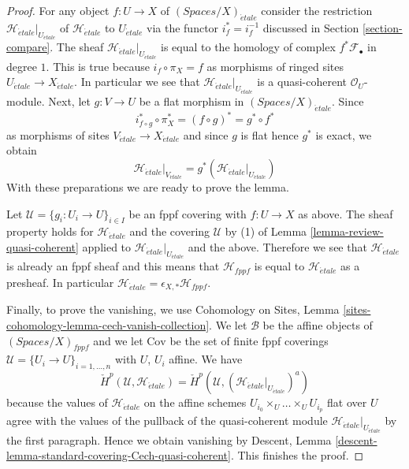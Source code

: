 \documentclass{stacks-project}
\theoremstyle{plain}
\theoremstyle{definition}
\theoremstyle{remark}
\numberwithin{equation}{subsection}
\def\etale{{\acute{e}tale}}
\begin{document}
\begin{proof}
For any object $f : U \to X$ of $(\textit{Spaces}/X)_\etale$
consider the restriction
$\mathcal{H}_\etale|_{U_\etale}$ of $\mathcal{H}_\etale$ to $U_\etale$ via
the functor $i_f^* = i_f^{-1}$ discussed in Section \ref{section-compare}.
The sheaf $\mathcal{H}_\etale|_{U_\etale}$
is equal to the homology of complex $f^*\mathcal{F}_\bullet$ in degree $1$.
This is true because $i_f \circ \pi_X = f$ as morphisms of ringed sites
$U_\etale \to X_\etale$. In particular we see that
$\mathcal{H}_\etale|_{U_\etale}$ is a quasi-coherent $\mathcal{O}_U$-module.
Next, let $g : V \to U$ be a flat
morphism in $(\textit{Spaces}/X)_\etale$. Since
$$
i_{f \circ g}^* \circ \pi_X^* = (f \circ g)^* = g^* \circ f^*
$$
as morphisms of sites $V_\etale \to X_\etale$ and since $g$ is flat
hence $g^*$ is exact, we obtain
$$
\mathcal{H}_\etale|_{V_\etale} =
g^*\left(\mathcal{H}_\etale|_{U_\etale}\right)
$$
With these preparations we are ready to prove the lemma.

\medskip\noindent
Let $\mathcal{U} = \{g_i : U_i \to U\}_{i \in I}$ be an fppf covering
with $f : U \to X$ as above. The sheaf property holds for
$\mathcal{H}_\etale$ and the covering $\mathcal{U}$
by (1) of Lemma \ref{lemma-review-quasi-coherent}
applied to $\mathcal{H}_\etale|_{U_\etale}$ and the above.
Therefore we see that $\mathcal{H}_\etale$ is already an fppf
sheaf and this means that $\mathcal{H}_{fppf}$ is
equal to $\mathcal{H}_\etale$
as a presheaf. In particular
$\mathcal{H}_\etale = \epsilon_{X, *}\mathcal{H}_{fppf}$.

\medskip\noindent
Finally, to prove the vanishing, we use
Cohomology on Sites, Lemma \ref{sites-cohomology-lemma-cech-vanish-collection}.
We let $\mathcal{B}$ be the affine objects of
$(\textit{Spaces}/X)_{fppf}$ and we let
$\text{Cov}$ be the set of finite fppf coverings
$\mathcal{U} = \{U_i \to U\}_{i = 1, \ldots, n}$ with $U$, $U_i$ affine.
We have
$$
{\check H}^p(\mathcal{U}, \mathcal{H}_\etale) =
{\check H}^p(\mathcal{U}, \left(\mathcal{H}_\etale|_{U_\etale}\right)^a)
$$
because the values of $\mathcal{H}_\etale$ on the
affine schemes $U_{i_0} \times_U \ldots \times_U U_{i_p}$
flat over $U$ agree with the values of the pullback
of the quasi-coherent module $\mathcal{H}_\etale|_{U_\etale}$ by
the first paragraph. Hence we obtain vanishing by
Descent, Lemma \ref{descent-lemma-standard-covering-Cech-quasi-coherent}.
This finishes the proof.
\end{proof}
\end{document}
